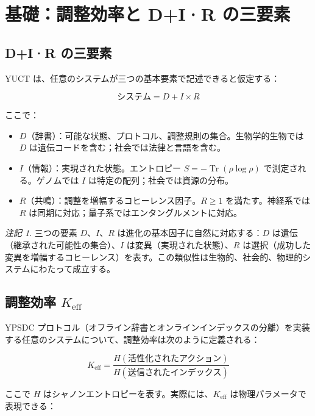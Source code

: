 \documentclass[12pt,a4paper]{article}
\newcommand{\Keff}{K_{\mathrm{eff}}}
\DeclareMathOperator{\Tr}{Tr}
\theoremstyle{remark}
\newtheorem{remark}[theorem]{注記}
\begin{document}
	\section{基礎：調整効率と D+I·R の三要素}
	\label{sec:foundations}
	
	\subsection{D+I·R の三要素}
	
	YUCT は、任意のシステムが三つの基本要素で記述できると仮定する：
	
	\begin{equation}
		\text{システム} = D + I \times R
		\label{eq:triad}
	\end{equation}
	
	ここで：
	\begin{itemize}
		\item $D$（辞書）：可能な状態、プロトコル、調整規則の集合。生物学的生物では $D$ は遺伝コードを含む；社会では法律と言語を含む。
		\item $I$（情報）：実現された状態。エントロピー $S = -\Tr(\rho \log \rho)$ で測定される。ゲノムでは $I$ は特定の配列；社会では資源の分布。
		\item $R$（共鳴）：調整を増幅するコヒーレンス因子。$R \geq 1$ を満たす。神経系では $R$ は同期に対応；量子系ではエンタングルメントに対応。
	\end{itemize}
	
	\begin{remark}
		三つの要素 $D$、$I$、$R$ は進化の基本因子に自然に対応する：$D$ は遺伝（継承された可能性の集合）、$I$ は変異（実現された状態）、$R$ は選択（成功した変異を増幅するコヒーレンス）を表す。この類似性は生物的、社会的、物理的システムにわたって成立する。
	\end{remark}
	
	\subsection{調整効率 \(\Keff\)}
	
	YPSDC プロトコル（オフライン辞書とオンラインインデックスの分離）を実装する任意のシステムについて、調整効率は次のように定義される：
	
	\begin{equation}
		\Keff = \frac{H(\text{活性化されたアクション})}{H(\text{送信されたインデックス})}
		\label{eq:keff-def}
	\end{equation}
	
	ここで $H$ はシャノンエントロピーを表す。実際には、\(\Keff\) は物理パラメータで表現できる：
	
\end{document}
